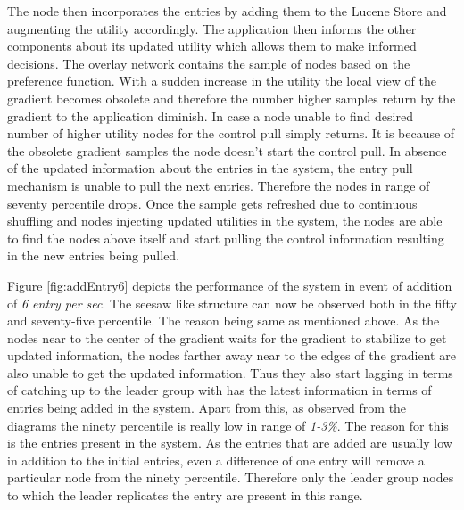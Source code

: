 \documentclass[12pt,a4paper,twoside,openright]{book}
\begin{document}
\par The node then incorporates the entries by adding them to the Lucene Store and augmenting the utility accordingly. The application then informs the other components about its updated utility which allows them to make informed decisions. The overlay network contains the sample of nodes based on the preference function. With a sudden increase in the utility the local view of the gradient becomes obsolete and therefore the number higher samples return by the gradient to the application diminish. In case a node unable to find desired number of higher utility nodes for the control pull simply returns. It is because of the obsolete gradient samples the node doesn't start the control pull. In absence of the updated information about the entries in the system, the entry pull mechanism is unable to pull the next entries. Therefore the nodes in range of seventy percentile drops. Once the sample gets refreshed due to continuous shuffling and nodes injecting updated utilities in the system, the nodes are able to find the nodes above itself and start pulling the control information  resulting in the new entries being pulled.

\par Figure \ref{fig:addEntry6} depicts the performance of the system in event of addition of \textit{6 entry per sec}. The seesaw like structure can now be observed both in the fifty and seventy-five percentile. The reason being same as mentioned above. As the nodes near to the center of the gradient waits for the gradient to stabilize to get updated information, the nodes farther away near to the edges of the gradient are also unable to get the updated information. Thus they also start lagging in terms of catching up to the leader group with has the latest information in terms of entries being added in the system. Apart from this, as observed from the diagrams the ninety percentile is really low in range of \textit{1-3\%}. The reason for this is the entries present in the system. As the entries that are added are usually low in addition to the initial entries, even a difference of one entry will remove a particular node from the ninety percentile. Therefore only the leader group nodes to which the leader replicates the entry are present in this range.
\end{document}
